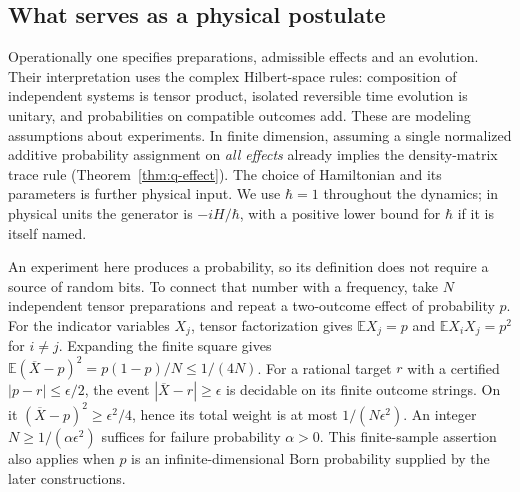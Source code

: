 \subsection{What serves as a physical postulate}
Operationally one specifies preparations, admissible effects and an evolution. Their interpretation uses the complex Hilbert-space rules: composition of independent systems is tensor product, isolated reversible time evolution is unitary, and probabilities on compatible outcomes add. These are modeling assumptions about experiments. In finite dimension, assuming a single normalized additive probability assignment on \emph{all effects} already implies the density-matrix trace rule (Theorem~\ref{thm:q-effect}). The choice of Hamiltonian and its parameters is further physical input. We use $\hbar=1$ throughout the dynamics; in physical units the generator is $-iH/\hbar$, with a positive lower bound for $\hbar$ if it is itself named.

An experiment here produces a probability, so its definition does not require a source of random bits. To connect that number with a frequency, take $N$ independent tensor preparations and repeat a two-outcome effect of probability $p$. For the indicator variables $X_j$, tensor factorization gives $\mathbb E X_j=p$ and $\mathbb E X_iX_j=p^2$ for $i\ne j$. Expanding the finite square gives $\mathbb E(\overline X-p)^2=p(1-p)/N\le1/(4N)$. For a rational target $r$ with a certified $|p-r|\le\epsilon/2$, the event $|\overline X-r|\ge\epsilon$ is decidable on its finite outcome strings. On it $(\overline X-p)^2\ge\epsilon^2/4$, hence its total weight is at most $1/(N\epsilon^2)$. An integer $N\ge1/(\alpha\epsilon^2)$ suffices for failure probability $\alpha>0$. This finite-sample assertion also applies when $p$ is an infinite-dimensional Born probability supplied by the later constructions.
